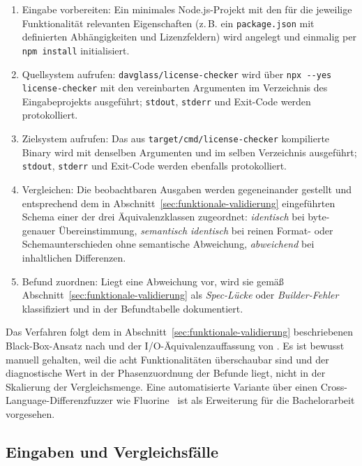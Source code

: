\begin{enumerate}
\item Eingabe vorbereiten: Ein minimales Node.js-Projekt mit den für die jeweilige Funktionalität relevanten Eigenschaften (z.\,B. ein \texttt{package.json} mit definierten Abhängigkeiten und Lizenzfeldern) wird angelegt und einmalig per \texttt{npm install} initialisiert.
\item Quellsystem aufrufen: \texttt{davglass/license-checker} wird über \texttt{npx -{}-yes license-checker} mit den vereinbarten Argumenten im Verzeichnis des Eingabeprojekts ausgeführt; \texttt{stdout}, \texttt{stderr} und Exit-Code werden protokolliert.
\item Zielsystem aufrufen: Das aus \texttt{target/cmd/license-checker} kompilierte Binary wird mit denselben Argumenten und im selben Verzeichnis ausgeführt; \texttt{stdout}, \texttt{stderr} und Exit-Code werden ebenfalls protokolliert.
\item Vergleichen: Die beobachtbaren Ausgaben werden gegeneinander gestellt und entsprechend dem in Abschnitt~\ref{sec:funktionale-validierung} eingeführten Schema einer der drei Äquivalenzklassen zugeordnet: \emph{identisch} bei byte-genauer Übereinstimmung, \emph{semantisch identisch} bei reinen Format- oder Schemaunterschieden ohne semantische Abweichung, \emph{abweichend} bei inhaltlichen Differenzen.
\item Befund zuordnen: Liegt eine Abweichung vor, wird sie gemäß Abschnitt~\ref{sec:funktionale-validierung} als \emph{Spec-Lücke} oder \emph{Builder-Fehler} klassifiziert und in der Befundtabelle dokumentiert.
\end{enumerate}

Das Verfahren folgt dem in Abschnitt~\ref{sec:funktionale-validierung} beschriebenen Black-Box-Ansatz nach \textcite{mckeeman1998differentialtesting} und der I/O-Äquivalenzauffassung von \textcite{eniser2025realworld}. Es ist bewusst manuell gehalten, weil die acht Funktionalitäten überschaubar sind und der diagnostische Wert in der Phasenzuordnung der Befunde liegt, nicht in der Skalierung der Vergleichsmenge. Eine automatisierte Variante über einen Cross-Language-Differenzfuzzer wie Fluorine~\parencite{eniser2025realworld} ist als Erweiterung für die Bachelorarbeit vorgesehen.

\subsection{Eingaben und Vergleichsfälle}\label{anhang:faelle}

